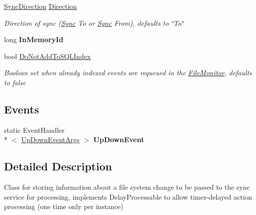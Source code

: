 \begin{DoxyCompactItemize}
\hyperlink{namespace_cloud_api_public_1_1_static_a8ba5d1f6d06fa058730616f021c8974f}{Sync\-Direction} \hyperlink{class_cloud_api_public_1_1_model_1_1_file_change_ae9286566d391fe9d646db55e20b1ccab}{Direction}
\begin{DoxyCompactList}\small\item\em Direction of sync (\hyperlink{namespace_cloud_api_public_1_1_sync}{Sync} To or \hyperlink{namespace_cloud_api_public_1_1_sync}{Sync} From), defaults to \char`\"{}\-To\char`\"{} \end{DoxyCompactList}\item 
\hypertarget{class_cloud_api_public_1_1_model_1_1_file_change_a150bd50fceae6c179f1bc34debb933e5}{long {\bfseries In\-Memory\-Id}}\label{class_cloud_api_public_1_1_model_1_1_file_change_a150bd50fceae6c179f1bc34debb933e5}

\item 
bool \hyperlink{class_cloud_api_public_1_1_model_1_1_file_change_aa979e65ac9cd9783870afe5b25137296}{Do\-Not\-Add\-To\-S\-Q\-L\-Index}
\begin{DoxyCompactList}\small\item\em Boolean set when already indexed events are requeued in the \hyperlink{namespace_file_monitor}{File\-Monitor}, defaults to false \end{DoxyCompactList}\end{DoxyCompactItemize}
\subsection*{Events}
\begin{DoxyCompactItemize}
\item 
\hypertarget{class_cloud_api_public_1_1_model_1_1_file_change_aa21bd352b70154e019ff6cf0069396e9}{static Event\-Handler\\*
$<$ \hyperlink{class_cloud_api_public_1_1_model_1_1_file_change_1_1_up_down_event_args}{Up\-Down\-Event\-Args} $>$ {\bfseries Up\-Down\-Event}}\label{class_cloud_api_public_1_1_model_1_1_file_change_aa21bd352b70154e019ff6cf0069396e9}

\end{DoxyCompactItemize}


\subsection{Detailed Description}
Class for storing information about a file system change to be passed to the sync service for processing, implements Delay\-Processable to allow timer-\/delayed action processing (one time only per instance) 



